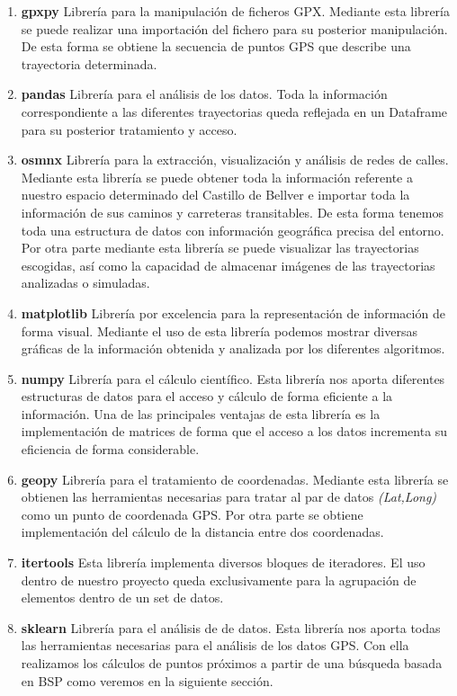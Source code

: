 \begin{enumerate}[label={L.\arabic*.}]
\item \textbf{gpxpy} Librería para la manipulación de ficheros \ac{GPX}. Mediante esta librería se puede realizar una importación del fichero para su posterior manipulación. De esta forma se obtiene la secuencia de puntos \ac{GPS} que describe una trayectoria determinada.
\item \textbf{pandas} Librería para el análisis de los datos. Toda la información correspondiente a las diferentes trayectorias queda reflejada en un Dataframe para su posterior tratamiento y acceso.
\item \textbf{osmnx} Librería para la extracción, visualización y análisis de redes de calles. Mediante esta librería se puede obtener toda la información referente a nuestro espacio determinado del Castillo de Bellver e importar toda la información de sus caminos y carreteras transitables. De esta forma tenemos toda una estructura de datos con información geográfica precisa del entorno. Por otra parte mediante esta librería se puede visualizar las trayectorias escogidas, así como la capacidad de almacenar imágenes de las trayectorias analizadas o simuladas.
\item \textbf{matplotlib} Librería por excelencia para la representación de información de forma visual. Mediante el uso de esta librería podemos mostrar diversas gráficas de la información obtenida y analizada por los diferentes algoritmos.
\item \textbf{numpy} Librería para el cálculo científico. Esta librería nos aporta diferentes estructuras de datos para el acceso y cálculo de forma eficiente a la información. Una de las principales ventajas de esta librería es la implementación de matrices de forma que el acceso a los datos incrementa su eficiencia de forma considerable.
\item \textbf{geopy} Librería para el tratamiento de coordenadas. Mediante esta librería se obtienen las herramientas necesarias para tratar al par de datos \textit{(Lat,Long)} como un punto de coordenada  \ac{GPS}. Por otra parte se obtiene implementación del cálculo de la distancia entre dos coordenadas.
\item \textbf{itertools} Esta librería implementa diversos bloques de iteradores. El uso dentro de nuestro proyecto queda exclusivamente para la agrupación de elementos dentro de un set de datos.
\item \textbf{sklearn} Librería para el análisis de de datos. Esta librería nos aporta todas las herramientas necesarias para el análisis de los datos \ac{GPS}. Con ella realizamos los cálculos de puntos próximos a partir de una búsqueda basada en \ac{BSP} como veremos en la siguiente sección.

\end{enumerate}
